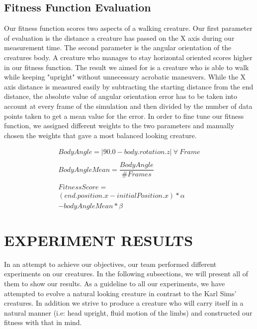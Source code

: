 \documentclass[letterpaper, 10 pt, conference]{ieeeconf}  %
\begin{document}
\subsection{Fitness Function Evaluation}
Our fitness function scores two aspects of a walking creature. Our first parameter of evaluation is the distance a creature has passed on the X axis during our measurement time. The second parameter is the angular orientation of the creatures body. A creature who manages to stay horizontal oriented scores higher in our fitness function. The result we aimed for is a creature who is able to walk while keeping "upright" without unnecessary acrobatic maneuvers. While the X axis distance is measured easily by subtracting the starting distance from the end distance, the absolute value of angular orientation error has to be taken into account at every frame of the simulation and then divided by the number of data points taken to get a mean value for the error. In order to fine tune our fitness function, we assigned different weights to the two parameters and manually chosen the weights that gave a most balanced looking creature.

\begin{align*}
BodyAngle = |90.0 - body.rotation.z| \ \forall \ Frame\\
\\
BodyAngleMean = \dfrac{BodyAngle}{\#Frames}\\
\\
Fitness Score = \\
	(end.position.x - initialPosition.x)*\alpha \\
	- bodyAngleMean*\beta
\end{align*}

\section{EXPERIMENT RESULTS}
In an attempt to achieve our objectives, our team performed different experiments on our creatures. In the following subsections, we will present all of them to show our results.
As a guideline to all our experiments, we have attempted to evolve a natural looking creature in contrast to the Karl Sims' creatures. In addition we strive to produce a creature who will carry itself in a natural manner (i.e: head upright, fluid motion of the limbs) and constructed our fitness with that in mind.
\end{document}
